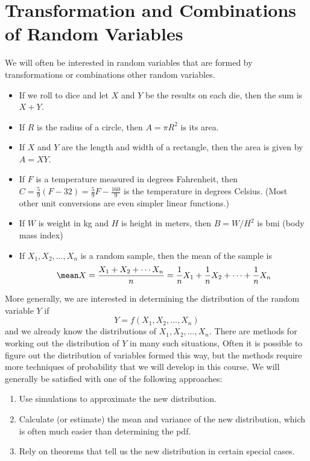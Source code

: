 \documentclass[twoside]{book}\usepackage[]{graphicx}\usepackage[]{xcolor}
\def\Chapter#1{%
\chapter{#1}
}
\newif\ifsolutions
\newif\ifsolutionslocal
\begin{document}
\shipoutProblems

\ifsolutions
\ifsolutionslocal
\newpage
\section*{Solutions}
\shipoutSolutions
\fi
\fi





\Chapter{Transformation and Combinations of Random Variables}

We will often be interested in random variables that are formed by transformations
or combinations other random variables.
\begin{itemize}
	\item
		If we roll to dice and let $X$ and $Y$ be the results on each die,
		then the sum is $X+Y$.
	\item
		If $R$ is the radius of a circle, then $A = \pi R^2$ is its area.
	\item
		If $X$ and $Y$ are the length and width of a rectangle, then
		the area is given by $A = X Y$.
	\item
		If $F$ is a temperature measured in degrees Fahrenheit, then 
		$C = \frac{5}{9}(F-32) = \frac59 F - \frac{160}{9}$ is the 
		temperature in degrees Celsius. (Most other unit conversions
		are even simpler linear functions.)
	\item
		If $W$ is weight in kg and $H$ is height in meters, then
		$B = W/H^2$ is bmi (body mass index)

	\item
		If $X_1, X_2, \dots, X_n$ is a random sample, then the mean of the sample
		is 
		\[
		\mean X = \frac{X_1 + X_2 + \cdots X_n}{n}
		=
		\frac1n X_1 +
		\frac1n X_2 + \cdots +
		\frac1n X_n 
		\]
	\end{itemize}

More generally, we are interested in determining the distribution of the random 
variable $Y$ if 
\[Y = f(X_1, X_2, \dots, X_n)\]
and we already know the distributions of $X_1, X_2, \dots, X_n$.
There are methods for working out the distribution of $Y$ in many such situations, 
Often it is possible to figure out the distribution of variables formed this way,
but the methods require more techniques of probability that we will develop in this 
course.  We will generally be satisfied with one of the following approaches:
\begin{enumerate}
	\item
		Use simulations to approximate the new distribution.
	\item
		Calculate (or estimate) the mean and variance of the new distribution,
		which is often much easier than determining the pdf.
	\item
		Rely on theorems that tell us the new distribution in certain special
		cases.
\end{enumerate}
\end{document}
